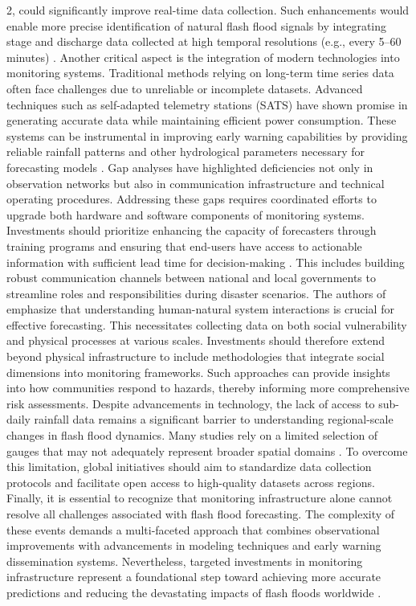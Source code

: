 2, could significantly improve real-time data collection. Such enhancements would enable more precise identification of natural flash flood signals by integrating stage and discharge data collected at high temporal resolutions (e.g., every 5–60 minutes) \citep{Barthold2015}. Another critical aspect is the integration of modern technologies into monitoring systems. Traditional methods relying on long-term time series data often face challenges due to unreliable or incomplete datasets. Advanced techniques such as self-adapted telemetry stations (SATS) have shown promise in generating accurate data while maintaining efficient power consumption. These systems can be instrumental in improving early warning capabilities by providing reliable rainfall patterns and other hydrological parameters necessary for forecasting models \citep{AlRawas2024}. Gap analyses have highlighted deficiencies not only in observation networks but also in communication infrastructure and technical operating procedures. Addressing these gaps requires coordinated efforts to upgrade both hardware and software components of monitoring systems. Investments should prioritize enhancing the capacity of forecasters through training programs and ensuring that end-users have access to actionable information with sufficient lead time for decision-making \citep{Jubach2016}. This includes building robust communication channels between national and local governments to streamline roles and responsibilities during disaster scenarios. The authors of \citep{Borga2019} emphasize that understanding human-natural system interactions is crucial for effective forecasting. This necessitates collecting data on both social vulnerability and physical processes at various scales. Investments should therefore extend beyond physical infrastructure to include methodologies that integrate social dimensions into monitoring frameworks. Such approaches can provide insights into how communities respond to hazards, thereby informing more comprehensive risk assessments. Despite advancements in technology, the lack of access to sub-daily rainfall data remains a significant barrier to understanding regional-scale changes in flash flood dynamics. Many studies rely on a limited selection of gauges that may not adequately represent broader spatial domains \citep{Fowler2021}. To overcome this limitation, global initiatives should aim to standardize data collection protocols and facilitate open access to high-quality datasets across regions. Finally, it is essential to recognize that monitoring infrastructure alone cannot resolve all challenges associated with flash flood forecasting. The complexity of these events demands a multi-faceted approach that combines observational improvements with advancements in modeling techniques and early warning dissemination systems. Nevertheless, targeted investments in monitoring infrastructure represent a foundational step toward achieving more accurate predictions and reducing the devastating impacts of flash floods worldwide \citep{AlRawas2024}\citep{Pham2020}\citep{Marjerison2016}.
